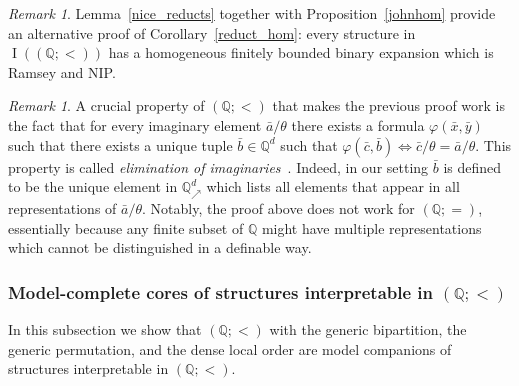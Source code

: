 \documentclass{amsart}
\theoremstyle{definition}
\theoremstyle{remark}
\newtheorem{remark}[theorem]{Remark}
\numberwithin{equation}{section}
\DeclareMathOperator{\I}{\operatorname{I}}
\newcommand{\atoms}{({\mathbb Q};=)}
\newcommand\qup[1]{\mathbb{Q}_\nearrow^{#1}}
\begin{document}
\begin{remark}\label{rem:ramsey-exp}
	Lemma~\ref{nice_reducts} together with Proposition~\ref{johnhom} provide an alternative proof of Corollary~\ref{reduct_hom}: 
    every structure in $\I(({\mathbb Q};<))$ has a homogeneous finitely bounded binary expansion which is Ramsey and NIP.
\end{remark} 

	\begin{remark} 
    A crucial property of $(\mathbb{Q};<)$ that makes the previous proof work is the fact that for every imaginary element $\bar{a}/\theta$ there exists a formula $\varphi(\bar{x},\bar{y})$ such that there exists a unique tuple $\bar{b}\in \mathbb{Q}^d$ such that $\varphi(\bar{c},\bar{b})\Leftrightarrow \bar{c}/\theta=\bar{a}/\theta$. This property is called \emph{elimination of imaginaries}~\cite{HodgesLong}. Indeed, in our setting $\bar{b}$ is defined to be the unique element in $\qup{d}$ which lists all elements that appear in all representations of $\bar{a}/\theta$. Notably, the proof above does not work for $\atoms$, 
    essentially because any finite subset of $\mathbb{Q}$ might have multiple representations which cannot be distinguished in a definable way.
    \end{remark}

\subsubsection{Model-complete cores of structures interpretable in $({\mathbb Q};<)$}\label{sect:in_q}
	In this subsection we show that $(\mathbb{Q};<)$ with the generic bipartition, the generic permutation, and the dense local order  are model companions of  structures
    interpretable in $(\mathbb{Q};<)$. 
\end{document}
